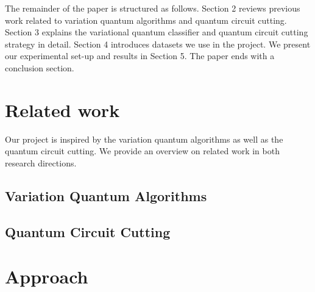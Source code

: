 \documentclass[sigconf]{acmart}
\begin{document}
The remainder of the paper is structured as follows. Section 2 reviews previous work related to variation quantum algorithms and quantum circuit cutting. Section 3 explains the variational quantum classifier and quantum circuit cutting strategy in detail. Section 4 introduces datasets we use in the project. We present our experimental set-up and results in Section 5. The paper ends with a conclusion section.

\section{Related work}

Our project is inspired by the variation quantum algorithms as well as the quantum circuit cutting. We provide an overview on related work in both research directions.

\subsection{Variation Quantum Algorithms}

\subsection{Quantum Circuit Cutting}


\section{Approach}
\end{document}
